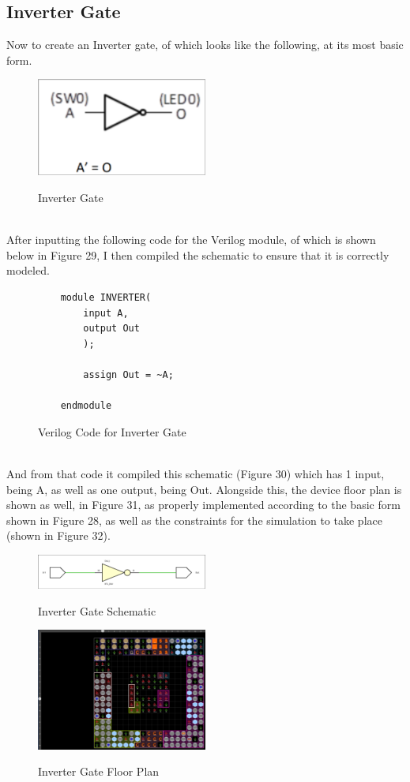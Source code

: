 \documentclass{article}
\begin{document}
\subsection{Inverter Gate}
Now to create an Inverter gate, of which looks like the following, at its most basic form.\\
\begin{figure}[!htbp]
    \centering
    \caption{Inverter Gate}
    \includegraphics[width=0.5\textwidth]{Inverter-GATE.png}
    \label{Inverter Gate, Simple}
\end{figure}\\
After inputting the following code for the Verilog module, of which is shown below in Figure 29, I then compiled the schematic to ensure that it is correctly modeled.\\
\begin{figure}[!htbp]
    \centering
    \caption{Verilog Code for Inverter Gate}
    \begin{verbatim}
    module INVERTER(
        input A,
        output Out
        );
        
        assign Out = ~A;
        
    endmodule
    \end{verbatim}
\end{figure}\\
And from that code it compiled this schematic (Figure 30) which has 1 input, being A, as well as one output, being Out. Alongside this, the device floor plan is shown as well, in Figure 31, as properly implemented according to the basic form shown in Figure 28, as well as the constraints for the simulation to take place (shown in Figure 32).
\begin{figure}[!!htbpbp]
    \centering
    \caption{Inverter Gate Schematic}
    \includegraphics[width=0.5\textwidth]{Inverter-GATE-SCHEMATIC.png}
    \label{Inverter}
\end{figure}
\begin{figure}[!!htbpbp]
    \centering
    \caption{Inverter Gate Floor Plan}
    \includegraphics[width=0.5\textwidth]{Inverter-GATE-FLOOR-PLAN.png}
    \label{Inverter Gate, Floor Plan}
\end{figure}
\end{document}
